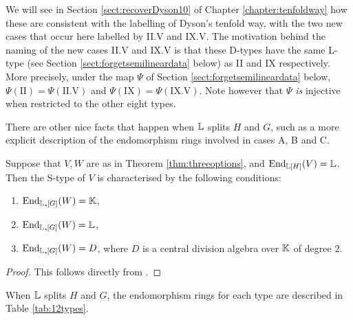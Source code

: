 We will see in Section \ref{sect:recoverDyson10} of Chapter \ref{chapter:tenfoldway} how these are consistent with the labelling of Dyson's tenfold way, with the two new cases that occur here labelled by II.V and IX.V. The motivation behind the naming of the new cases II.V and IX.V is that these D-types have the same L-type (see Section \ref{sect:forgetsemilineardata} below) as II and IX respectively. More precisely, under the map $\Psi$ of Section \ref{sect:forgetsemilineardata} below, $\Psi(\text{II}) = \Psi(\text{II.V})$ and $\Psi(\text{IX}) = \Psi(\text{IX.V})$. Note however that $\Psi$ \emph{is} injective when restricted to the other eight types.

There are other nice facts that happen when ${\mathbb L}$ splits $H$ and $G$, such as a more explicit description of the endomorphism rings involved in cases A, B and C.

\begin{prop}\label{prop:endringwhensplit}
    Suppose that $V, W$ are as in Theorem \ref{thm:threeoptions}, and $\operatorname{End}_{{\mathbb L}[H]}(V) = {\mathbb L}$. Then the S-type of $V$ is characterised by the following conditions:
    \begin{enumerate}
        \item[\emph{(A)}] $\operatorname{End}_{{\mathbb L}_{\star \hspace{-0.1em}}[G]}(W) = {\mathbb K}$,
        \item[\emph{(B)}] $\operatorname{End}_{{\mathbb L}_{\star \hspace{-0.1em}}[G]}(W) = {\mathbb L}$,
        \item[\emph{(C)}] $\operatorname{End}_{{\mathbb L}_{\star \hspace{-0.1em}}[G]}(W) = D$, where $D$ is a central division algebra over ${\mathbb K}$ of degree $2$.
    \end{enumerate}
\end{prop}

\begin{proof}
    This follows directly from \cite[Prop.\ 8.28]{TAYSchur}.
\end{proof}

\begin{cor}
    When ${\mathbb L}$ splits $H$ and $G$, the endomorphism rings for each type are described in Table \ref{tab:12types}.
\end{cor}

